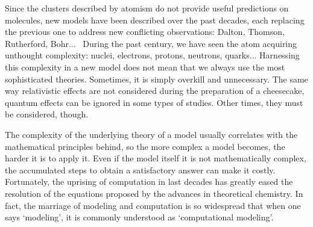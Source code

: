 Since the clusters described by atomism do not provide useful predictions on molecules, new models have been described over the past decades, each replacing the previous one to address new conflicting observations: Dalton, Thomson, Rutherford, Bohr$ \ldots $ \  During the past century, we have seen the atom acquiring unthought complexity: nuclei, electrons, protons, neutrons, quarks$ \ldots $  Harnessing this complexity in a new model does not mean that we always use the most sophisticated theories. Sometimes, it is simply overkill and unnecessary. The same way relativistic effects are not considered during the preparation of a cheesecake, quantum effects can be ignored in some types of studies. Other times, they must be considered, though.

The complexity of the underlying theory of a model usually correlates with the mathematical principles behind, so the more complex a model becomes, the harder it is to apply it. Even if the model itself it is not mathematically complex, the accumulated steps to obtain a satisfactory answer can make it costly. Fortunately, the uprising of computation in last decades has greatly eased the resolution of the equations proposed by the advances in theoretical chemistry. In fact, the marriage of modeling and computation is so widespread that when one says ‘modeling’, it is commonly understood as ‘computational modeling’.